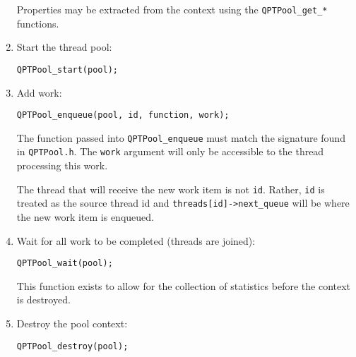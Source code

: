 \begin{enumerate}
  Properties may be extracted from the context using the
  \texttt{QPTPool\_get\_*} functions.

\item Start the thread pool:

  \texttt{QPTPool\_start(pool);}

\item Add work:

  \texttt{QPTPool\_enqueue(pool, id, function, work);}

  The function passed into \texttt{QPTPool\_enqueue} must match the
  signature found in \texttt{QPTPool.h}. The \texttt{work} argument
  will only be accessible to the thread processing this work.

  The thread that will receive the new work item is not \texttt{id}.
  Rather, \texttt{id} is treated as the source thread id and
  \texttt{threads[id]->next\_queue} will be where the new work item is
  enqueued.

\item Wait for all work to be completed (threads are joined):

  \texttt{QPTPool\_wait(pool);}

  This function exists to allow for the collection of statistics
  before the context is destroyed.

\item Destroy the pool context:

  \texttt{QPTPool\_destroy(pool);}
\end{enumerate}
